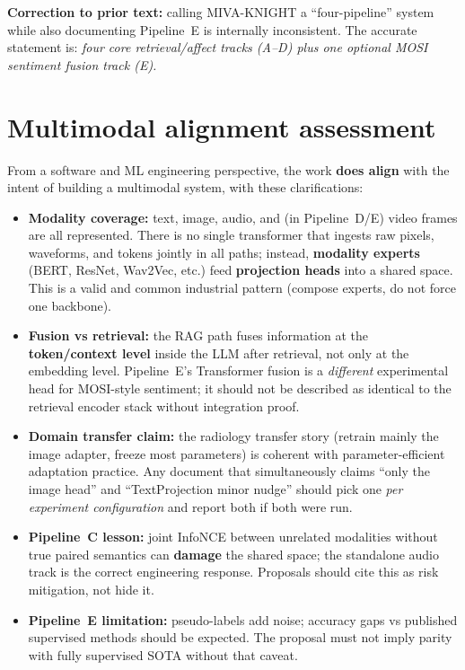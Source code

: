 \documentclass[12pt,a4paper]{article}
\begin{document}
\noindent
\textbf{Correction to prior text:} calling MIVA-KNIGHT a ``four-pipeline'' system
while also documenting Pipeline~E is internally inconsistent. The accurate statement
is: \emph{four core retrieval/affect tracks (A--D) plus one optional MOSI sentiment
fusion track (E).}

\section{Multimodal alignment assessment}

From a software and ML engineering perspective, the work \textbf{does align} with the
intent of building a multimodal system, with these clarifications:

\begin{itemize}
  \item \textbf{Modality coverage:} text, image, audio, and (in Pipeline~D/E) video
        frames are all represented. There is no single transformer that ingests raw
        pixels, waveforms, and tokens jointly in all paths; instead, \textbf{modality
        experts} (BERT, ResNet, Wav2Vec, etc.) feed \textbf{projection heads} into a
        shared space. This is a valid and common industrial pattern (compose experts,
        do not force one backbone).
  \item \textbf{Fusion vs retrieval:} the RAG path fuses information at the
        \textbf{token/context level} inside the LLM after retrieval, not only at the
        embedding level. Pipeline~E's Transformer fusion is a \emph{different}
        experimental head for MOSI-style sentiment; it should not be described as
        identical to the retrieval encoder stack without integration proof.
  \item \textbf{Domain transfer claim:} the radiology transfer story (retrain mainly
        the image adapter, freeze most parameters) is coherent with parameter-efficient
        adaptation practice. Any document that simultaneously claims ``only the image
        head'' and ``TextProjection minor nudge'' should pick one \emph{per experiment
        configuration} and report both if both were run.
  \item \textbf{Pipeline~C lesson:} joint InfoNCE between unrelated modalities without
        true paired semantics can \textbf{damage} the shared space; the standalone
        audio track is the correct engineering response. Proposals should cite this as
        risk mitigation, not hide it.
  \item \textbf{Pipeline~E limitation:} pseudo-labels add noise; accuracy gaps vs
        published supervised methods should be expected. The proposal must not imply
        parity with fully supervised SOTA without that caveat.
\end{itemize}
\end{document}
